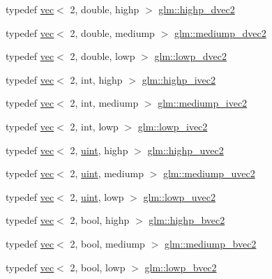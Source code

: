 \begin{DoxyCompactItemize}
\item 
typedef \hyperlink{structglm_1_1vec}{vec}$<$ 2, double, highp $>$ \hyperlink{group__core__precision_gadec51e8e57b72d8fc95e87f18d1ad4dd}{glm\+::highp\+\_\+dvec2}
\item 
typedef \hyperlink{structglm_1_1vec}{vec}$<$ 2, double, mediump $>$ \hyperlink{group__core__precision_ga71307e1aa231cbc5d9de712a92714496}{glm\+::mediump\+\_\+dvec2}
\item 
typedef \hyperlink{structglm_1_1vec}{vec}$<$ 2, double, lowp $>$ \hyperlink{group__core__precision_gab2db907304a5b726a369c351e02357fe}{glm\+::lowp\+\_\+dvec2}
\item 
typedef \hyperlink{structglm_1_1vec}{vec}$<$ 2, int, highp $>$ \hyperlink{group__core__precision_gad2b0693752b92e6644be9f1c3e50a451}{glm\+::highp\+\_\+ivec2}
\item 
typedef \hyperlink{structglm_1_1vec}{vec}$<$ 2, int, mediump $>$ \hyperlink{group__core__precision_ga0efcfa6750f1c7197ff1c3390521ffd7}{glm\+::mediump\+\_\+ivec2}
\item 
typedef \hyperlink{structglm_1_1vec}{vec}$<$ 2, int, lowp $>$ \hyperlink{group__core__precision_gab85314d1bfbed099461a545d5fb75be1}{glm\+::lowp\+\_\+ivec2}
\item 
typedef \hyperlink{structglm_1_1vec}{vec}$<$ 2, \hyperlink{group__core__precision_ga4fd29415871152bfb5abd588334147c8}{uint}, highp $>$ \hyperlink{group__core__precision_ga34aca1cdf2130b1179fd7c5554bc1883}{glm\+::highp\+\_\+uvec2}
\item 
typedef \hyperlink{structglm_1_1vec}{vec}$<$ 2, \hyperlink{group__core__precision_ga4fd29415871152bfb5abd588334147c8}{uint}, mediump $>$ \hyperlink{group__core__precision_ga35052256be4d47b9cb80114ca043cfaf}{glm\+::mediump\+\_\+uvec2}
\item 
typedef \hyperlink{structglm_1_1vec}{vec}$<$ 2, \hyperlink{group__core__precision_ga4fd29415871152bfb5abd588334147c8}{uint}, lowp $>$ \hyperlink{group__core__precision_gaf2f2771efb431071890586c01401ebd8}{glm\+::lowp\+\_\+uvec2}
\item 
typedef \hyperlink{structglm_1_1vec}{vec}$<$ 2, bool, highp $>$ \hyperlink{group__core__precision_gad8f63e4c7546320f6b72808fadfda3c2}{glm\+::highp\+\_\+bvec2}
\item 
typedef \hyperlink{structglm_1_1vec}{vec}$<$ 2, bool, mediump $>$ \hyperlink{group__core__precision_ga84008d451452ffe0f6c8f395fd61a8df}{glm\+::mediump\+\_\+bvec2}
\item 
typedef \hyperlink{structglm_1_1vec}{vec}$<$ 2, bool, lowp $>$ \hyperlink{group__core__precision_ga5529a08a5bb9e851a582f7c4cfa74ba0}{glm\+::lowp\+\_\+bvec2}

\end{DoxyCompactItemize}
